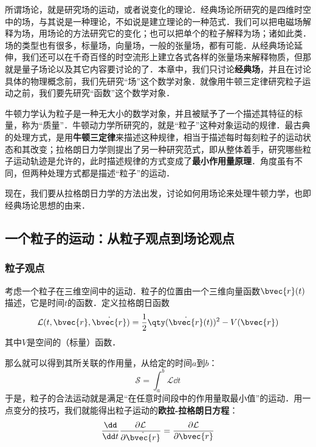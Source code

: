 





所谓场论，就是研究场的运动，或者说变化的理论．经典场论所研究的是四维时空中的场，与其说是一种理论，不如说是建立理论的一种范式．我们可以把电磁场解释为场，用场论的方法研究它的变化；也可以把单个的粒子解释为场；诸如此类．场的类型也有很多，标量场，向量场，一般的张量场，都有可能．从经典场论延伸，我们还可以在千奇百怪的时空流形上建立各式各样的张量场来解释物质，但那就是量子场论以及其它内容要讨论的了．本章中，我们只讨论\textbf{经典场}，并且在讨论具体的物理概念前，我们先研究“场”这个数学对象．就像用牛顿三定律研究粒子运动之前，我们要先研究“函数”这个数学对象．

牛顿力学认为粒子是一种无大小的数学对象，并且被赋予了一个描述其特征的标量，称为“质量”．牛顿动力学所研究的，就是“粒子”这种对象运动的规律．最古典的处理方式，是用\textbf{牛顿三定律}来描述这种规律，相当于描述每时每刻粒子的运动状态和其改变；拉格朗日力学则提出了另一种研究范式，即从整体着手，研究哪些粒子运动轨迹是允许的，此时描述规律的方式变成了\textbf{最小作用量原理}．角度虽有不同，但两种处理方式都是描述“粒子”的运动．

现在，我们要从拉格朗日力学的方法出发，讨论如何用场论来处理牛顿力学，也即经典场论思想的由来．


\subsection{一个粒子的运动：从粒子观点到场论观点}

\subsubsection{粒子观点}

考虑一个粒子在三维空间中的运动．粒子的位置由一个三维向量函数$\bvec{r}(t)$描述，它是时间$t$的函数．定义拉格朗日函数
\begin{equation}
\mathcal{L}(t, \bvec{r},\dot{\bvec{r}}) =\frac{1}{2}\qty(\dot{\bvec{r}}(t))^2-V(\bvec{r})
\end{equation}
其中$V$是空间的（标量）函数．

那么就可以得到其所关联的作用量，从给定的时间$a$到$b$：
\begin{equation}
\mathcal{S}=\int ^b_a \mathcal{L} \dd t
\end{equation}
于是，粒子的合法运动就是满足“在任意时间段中的作用量取最小值”的运动．用一点变分的技巧，我们就能得出粒子运动的\textbf{欧拉-拉格朗日方程}：
\begin{equation}\label{CFa1_eq1}
\frac{\dd}{\dd t}\frac{\partial\mathcal{L}}{\partial \dot{\bvec{r}}} = \frac{\partial\mathcal{L}}{\partial \bvec{r}}
\end{equation}

